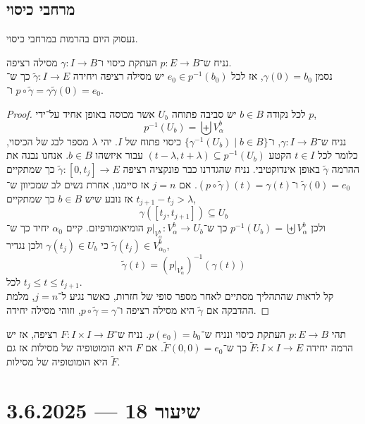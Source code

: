 \subsection{מרחבי כיסוי}
נעסוק היום בהרמות במרחבי כיסוי.
\begin{theorem}
	נניח ש־$p : E \to B$ העתקת כיסוי ו־$\gamma : I \to B$ מסילה רציפה. \\
	נסמן $\gamma(0) = b_0$, אז לכל $e_0 \in p^{-1}(b_0)$ יש מסילה רציפה ויחידה $\tilde{\gamma} : I \to E$ כך ש־$p \circ \tilde{\gamma} = \gamma$ ו־$\tilde{\gamma}(0) = e_0$.
\end{theorem}
\begin{proof}
	לכל נקודה $b \in B$ יש סביבה פתוחה $U_b$ אשר מכוסה באופן אחיד על־ידי $p$,
	\[
		p^{-1}(U_b)
		= \biguplus V_{\alpha}^b
	\]
	נניח ש־$\gamma : I \to B$, ו־$\{ \gamma^{-1}(U_b) \mid b \in B \}$ כיסוי פתוח של $I$.
	יהי $\lambda$ מספר לבג של הכיסוי, כלומר לכל $t \in I$ הקטע $(t - \lambda, t + \lambda) \subseteq p^{-1}(U_b)$ עבור איזשהו $b \in B$.
	אנחנו נבנה את ההרמה $\tilde{\gamma}$ באופן אינדוקטיבי.
	נניח שהגדרנו כבר פונקציה רציפה $\tilde{\gamma} : [0, t_j] \to E$ כך שמתקיים $\tilde{\gamma}(0) = e_0$ ו־$(p \circ \tilde{\gamma})(t) = \gamma(t)$.
	אם $j = n$ אז סיימנו, אחרת נשים לב שמכיוון ש־$t_{j + 1} - t_j > \lambda$ אז נובע שיש $b \in B$ כך שמתקיים,
	\[
		\gamma([t_j, t_{j + 1}]) \subseteq U_b
	\]
	ולכן $p^{-1}(U_b) = \biguplus V_{\alpha}^b$ כך ש־$p |_{V_{\alpha}^b} : V_{\alpha}^b \to U_b$ הומיאומורפיזם.
	קיים $\alpha_0$ יחיד כך ש־$\tilde{\gamma}(t_j) \in V_{\alpha_0}^b$ כי $\gamma(t_j) \in U_b$ ולכן נגדיר,
	\[
		\tilde{\gamma}(t)
		= {(p |_{V_{\alpha}^b})}^{-1}(\gamma(t))
	\]
	לכל $t_j \le t \le t_{j + 1}$. \\
	קל לראות שהתהליך מסתיים לאחר מספר סופי של חזרות, כאשר נגיע ל־$j = n$,
	מלמת ההדבקה אם $\tilde{\gamma}$ היא מסילה רציפה ו־$p \circ \tilde{\gamma} = \gamma$, וזוהי מסילה יחידה.
\end{proof}
\begin{theorem}
	תהי $p : E \to B$ העתקת כיסוי ונניח ש־$p(e_0) = b_0$.
	נניח ש־$F : I \times I \to B$ רציפה, אז יש הרמה יחידה $\tilde{F} : I \times I \to E$ כך ש־$\tilde{F}(0, 0) = e_0$.
	אם $F$ היא הומוטופיה של מסילות אז גם $\tilde{F}$ היא הומוטופיה של מסילות.
\end{theorem}

\section{שיעור 18 --- 3.6.2025}

